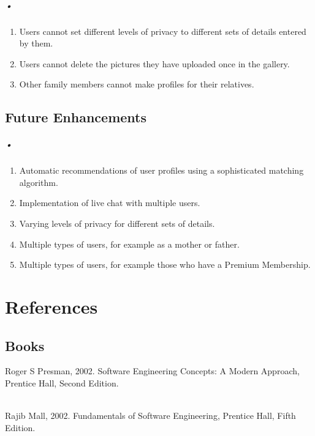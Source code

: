 \documentclass[12pt]{report}
\begin{document}
\paragraph*{•}
 
\begin{enumerate}
\item Users cannot set different levels of privacy to different sets of details entered by them. 
\item Users cannot delete the pictures they have uploaded once in the gallery. 
\item Other family members cannot make profiles for their relatives.
\end{enumerate}


\section{Future Enhancements}
\paragraph*{•}
 
\begin{enumerate}
\item Automatic recommendations of user profiles using a sophisticated matching algorithm.  
\item Implementation of live chat with multiple users.
\item Varying levels of privacy for different sets of details.
\item Multiple types of users, for example as a mother or father.
\item Multiple types of users, for example those who have a Premium Membership. 

\end{enumerate}

\chapter{References} 

\section{Books}
\noindent [1] Roger S Presman, 2002. Software Engineering Concepts: A Modern Approach, Prentice Hall, Second Edition. \\\

\noindent [2] Rajib Mall, 2002. Fundamentals of Software Engineering, Prentice Hall, Fifth Edition. \\\
\end{document}
